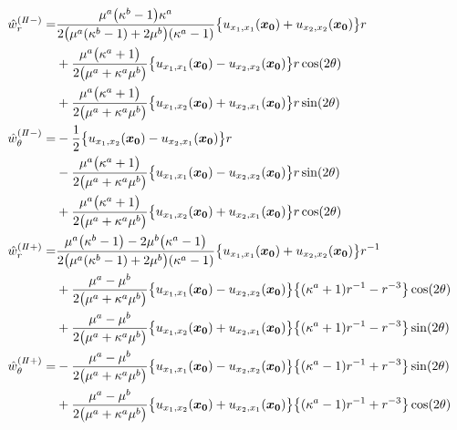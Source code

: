 \begin{align}
	\hat{w}_{r}^{(I\hspace{-.15em}I-)}=&
		\frac{\mu^{a}\bigl(\kappa^{b}-1\bigr)\kappa^{a}}{2\bigl(\mu^{a}(\kappa^{b}-1)+2\mu^{b}\bigr)(\kappa^{a}-1)}
		\bigl\{u_{x_{1},x_{1}}(\bm{x_{0}})+u_{x_{2},x_{2}}(\bm{x_{0}})\bigr\}r
		\nonumber
		\\
		&+\frac{\mu^{a}\bigl(\kappa^{a}+1\bigr)}{2\bigl(\mu^{a}+\kappa^{a}\mu^{b}\bigr)}
		\bigl\{u_{x_{1},x_{1}}(\bm{x_{0}})-u_{x_{2},x_{2}}(\bm{x_{0}})\bigr\}r\cos(2\theta)
		\nonumber
		\\
		&+\frac{\mu^{a}\bigl(\kappa^{a}+1\bigr)}{2\bigl(\mu^{a}+\kappa^{a}\mu^{b}\bigr)}
		\bigl\{u_{x_{1},x_{2}}(\bm{x_{0}})+u_{x_{2},x_{1}}(\bm{x_{0}})\bigr\}r\sin(2\theta)
		\\
	\hat{w}_{\theta}^{(I\hspace{-.15em}I-)}=&
		-\frac{1}{2}\bigl\{u_{x_{1},x_{2}}(\bm{x_{0}})-u_{x_{2},x_{1}}(\bm{x_{0}})\bigr\}r
		\nonumber
		\\
		&-\frac{\mu^{a}\bigl(\kappa^{a}+1\bigr)}{2\bigl(\mu^{a}+\kappa^{a}\mu^{b}\bigr)}
		\bigl\{u_{x_{1},x_{1}}(\bm{x_{0}})-u_{x_{2},x_{2}}(\bm{x_{0}})\bigr\}r\sin(2\theta)
		\nonumber
		\\
		&+\frac{\mu^{a}\bigl(\kappa^{a}+1\bigr)}{2\bigl(\mu^{a}+\kappa^{a}\mu^{b}\bigr)}
		\bigl\{u_{x_{1},x_{2}}(\bm{x_{0}})+u_{x_{2},x_{1}}(\bm{x_{0}})\bigr\}r\cos(2\theta)
		\\
	\hat{w}_{r}^{(I\hspace{-.15em}I+)}=&
		\frac{\mu^{a}\bigl(\kappa^{b}-1\bigr)-2\mu^{b}\bigl(\kappa^{a}-1\bigr)}{2\bigl(\mu^{a}(\kappa^{b}-1)+2\mu^{b}\bigr)(\kappa^{a}-1)}
		\bigl\{u_{x_{1},x_{1}}(\bm{x_{0}})+u_{x_{2},x_{2}}(\bm{x_{0}})\bigr\}r^{-1}
		\nonumber
		\\
		&+\frac{\mu^{a}-\mu^{b}}{2\bigl(\mu^{a}+\kappa^{a}\mu^{b}\bigr)}
		\bigl\{u_{x_{1},x_{1}}(\bm{x_{0}})-u_{x_{2},x_{2}}(\bm{x_{0}})\bigr\}
		\bigl\{(\kappa^{a}+1)r^{-1}-r^{-3}\bigr\}\cos(2\theta)
		\nonumber
		\\
		&+\frac{\mu^{a}-\mu^{b}}{2\bigl(\mu^{a}+\kappa^{a}\mu^{b}\bigr)}
		\bigl\{u_{x_{1},x_{2}}(\bm{x_{0}})+u_{x_{2},x_{1}}(\bm{x_{0}})\bigr\}
		\bigl\{(\kappa^{a}+1)r^{-1}-r^{-3}\bigr\}\sin(2\theta)
		\\
	\hat{w}_{\theta}^{(I\hspace{-.15em}I+)}=&
		-\frac{\mu^{a}-\mu^{b}}{2\bigl(\mu^{a}+\kappa^{a}\mu^{b}\bigr)}
		\bigl\{u_{x_{1},x_{1}}(\bm{x_{0}})-u_{x_{2},x_{2}}(\bm{x_{0}})\bigr\}
		\bigl\{(\kappa^{a}-1)r^{-1}+r^{-3}\bigr\}\sin(2\theta)
		\nonumber
		\\
		&+\frac{\mu^{a}-\mu^{b}}{2\bigl(\mu^{a}+\kappa^{a}\mu^{b}\bigr)}
		\bigl\{u_{x_{1},x_{2}}(\bm{x_{0}})+u_{x_{2},x_{1}}(\bm{x_{0}})\bigr\}
		\bigl\{(\kappa^{a}-1)r^{-1}+r^{-3}\bigr\}\cos(2\theta)
\end{align}
